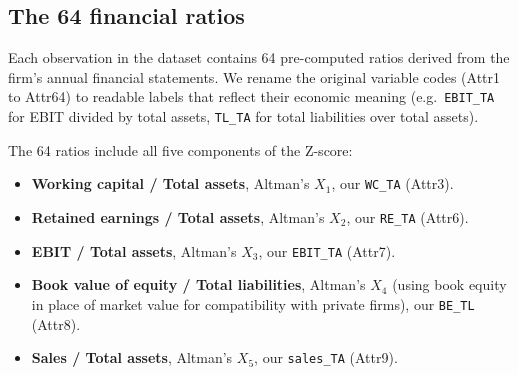 \documentclass[12pt,a4paper]{article}
\begin{document}
\begin{table}[ht]
\centering
\caption{Sample sizes and class balance by prediction horizon.$^{*}$}
\label{tab:horizons}
\centering
{}
\caption*{\footnotesize $^{*}$ The final two columns show the bankruptcy rate
(BR) separately for complete and incomplete rows, documenting the informative
missingness discussed in Section~\ref{sec:missing}. Source: author's
calculations.}
\end{table}

\subsection{The 64 financial ratios}
\label{sec:ratios}

Each observation in the dataset contains 64 pre-computed ratios derived from
the firm's annual financial statements. We rename the original variable codes
(Attr1 to Attr64) to readable labels that reflect their economic meaning
(e.g.\ \texttt{EBIT\_TA} for EBIT divided by total assets, \texttt{TL\_TA}
for total liabilities over total assets).

The 64 ratios include all five components of the \cite{altman1968} Z-score:

\begin{itemize}
\item \textbf{Working capital / Total assets}, Altman's $X_1$,
      our \texttt{WC\_TA} (Attr3).
\item \textbf{Retained earnings / Total assets}, Altman's $X_2$,
      our \texttt{RE\_TA} (Attr6).
\item \textbf{EBIT / Total assets}, Altman's $X_3$,
      our \texttt{EBIT\_TA} (Attr7).
\item \textbf{Book value of equity / Total liabilities}, Altman's $X_4$
      (using book equity in place of market value for compatibility with
      private firms), our \texttt{BE\_TL} (Attr8).
\item \textbf{Sales / Total assets}, Altman's $X_5$,
      our \texttt{sales\_TA} (Attr9).
\end{itemize}
\end{document}
